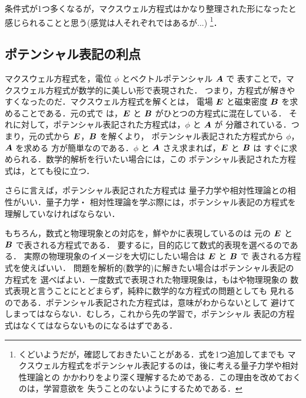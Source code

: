                     条件式が1つ多くなるが，マクスウェル方程式はかなり整理された形になったと
                    感じられることと思う(感覚は人それぞれではあるが...)
                      \footnote{
                        くどいようだが，確認しておきたいことがある．式を1つ追加してまでも
                        マクスウェル方程式をポテンシャル表記するのは，後に考える量子力学や相対性理論との
                        かかわりをより深く理解するためである．この理由を改めておくのは，学習意欲を
                        失うことのないようにするためである．
                      }．


        \subsection{ポテンシャル表記の利点}
                    マクスウェル方程式を，電位 $\phi$ とベクトルポテンシャル $\boldsymbol{A}$ で
                    表すことで，マクスウェル方程式が数学的に美しい形で表現された．
                    つまり，方程式が解きやすくなったのだ．マクスウェル方程式を解くとは，
                    電場 $\boldsymbol{E}$ と磁束密度 $\boldsymbol{B}$ を求めることである．元の式で
                    は，$\boldsymbol{E}$ と $\boldsymbol{B}$ がひとつの方程式に混在している．
                    それに対して，ポテンシャル表記された方程式は，$\phi$ と $\boldsymbol{A}$ が
                    分離されている．つまり，元の式から $\boldsymbol{E}$，$\boldsymbol{B}$ を解くより，
                    ポテンシャル表記された方程式から $\phi$，$\boldsymbol{A}$ を求める
                    方が簡単なのである．$\phi$ と $\boldsymbol{A}$ さえ求まれば，$\boldsymbol{E}$ と $\boldsymbol{B}$ は
                    すぐに求められる．数学的解析を行いたい場合には，この
                    ポテンシャル表記された方程式は，とても役に立つ．

                    さらに言えば，ポテンシャル表記された方程式は
                    量子力学や相対性理論との相性がいい．量子力学・
                    相対性理論を学ぶ際には，ポテンシャル表記の方程式を
                    理解していなければならない．

                    もちろん，数式と物理現象との対応を，鮮やかに表現しているのは
                    元の $\boldsymbol{E}$ と $\boldsymbol{B}$ で表される方程式である．
                    要するに，目的応じて数式的表現を選べるのである．
                    実際の物理現象のイメージを大切にしたい場合は $\boldsymbol{E}$ と $\boldsymbol{B}$ で
                    表される方程式を使えばいい．
                    問題を解析的(数学的)に解きたい場合はポテンシャル表記の方程式を
                    選べばよい．一度数式で表現された物理現象は，もはや物理現象の
                    数式表現と言うことにとどまらず，純粋に数学的な方程式の問題としても
                    見れるのである．ポテンシャル表記された方程式は，意味がわからないとして
                    避けてしまってはならない．むしろ，これから先の学習で，ポテンシャル
                    表記の方程式はなくてはならないものになるはずである．

